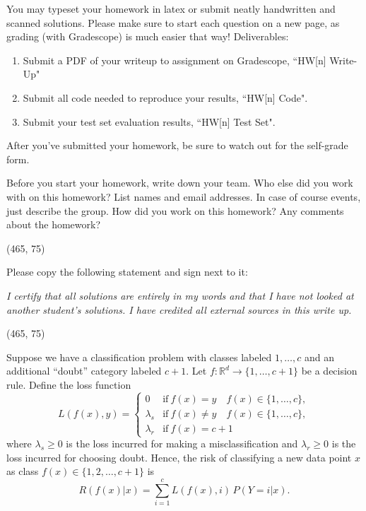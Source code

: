 
You may typeset your homework in latex or submit neatly handwritten and scanned solutions. Please make sure to start each question on a new page, as grading (with Gradescope) is much easier that way! Deliverables:

\begin{enumerate}
  \item Submit a PDF of your writeup to assignment on Gradescope, ``HW[n] Write-Up"
  \item Submit all code needed to reproduce your results, ``HW[n] Code".
  \item Submit your test set evaluation results, ``HW[n] Test Set".
\end{enumerate}

After you've submitted your homework, be sure to watch out for the self-grade form.

\begin{Parts}

\Part Before you start your homework, write down your team. Who else did you work with on this homework? List names and email addresses. In case of course events, just describe the group. How did you work on this homework? Any comments about the homework?

\vspace{15pt}
\framebox(465, 75){}

\Part Please copy the following statement and sign next to it:

\textit{I certify that all solutions are entirely in my words and that I have not looked at another student's solutions. I have credited all external sources in this write up.}

\vspace{15pt}
\framebox(465, 75){}

\end{Parts}

\pagebreak


Suppose we have a classification problem with classes labeled $1, \dotsc, c$ and an additional ``doubt'' category labeled $c+1$. Let $f : \mathbb{R}^d \to \{1, \dots, c+1 \}$ be a decision rule. Define the loss function
\begin{equation}
L(f(x), y) =
  \begin{cases}
   0 &  						 \mathrm{if}\ f(x)=y \quad f(x) \in\{1,\dotsc,c\}, \\
   \lambda_s       & \mathrm{if}\ f(x)\neq y \quad f(x) \in \{1,\dotsc,c\}, \\
   \lambda_r       & \mathrm{if}\ f(x)=c+1
  \end{cases}
\end{equation}
where $\lambda_s \geq 0$ is the loss incurred for making a misclassification and $\lambda_r \geq 0$ is the loss incurred for choosing doubt.
Hence, the risk of classifying a new data point $x$ as class $f(x) \in \{1,2,\dots,c+1\}$ is
$$R(f(x)|x) = \sum_{i=1}^{c} L(f(x), i) \, P(Y=i|x).$$

